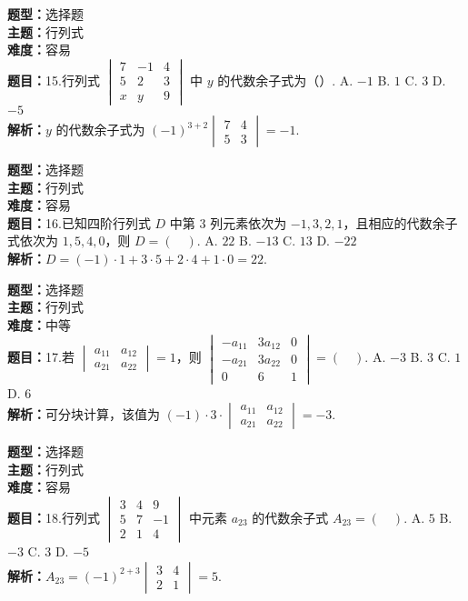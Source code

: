 \documentclass{ctexart}
\newenvironment{question}[5]{%
	\noindent\textbf{题型：}#1\\
	\textbf{主题：}#2\\
	\textbf{难度：}#3\\
	\textbf{题目：}#4\\
	\textbf{解析：}#5\\
	\vspace{1em}
}{}
\begin{document}
	\begin{question}
		{选择题}
		{行列式}
		{容易}
		{15.行列式 \(\begin{vmatrix}7 & -1 & 4 \\ 5 & 2 & 3 \\ x & y & 9\end{vmatrix}\) 中 \(y\) 的代数余子式为（\quad）. A. \(-1\) \quad B. \(1\) \quad C. \(3\) \quad D. \(-5\)}
		{\(y\) 的代数余子式为 \((-1)^{3+2} \begin{vmatrix}7 & 4 \\ 5 & 3\end{vmatrix} = -1\). }
	\end{question}
	
	\begin{question}
		{选择题}
		{行列式}
		{容易}
		{16.已知四阶行列式 \(D\) 中第 3 列元素依次为 \(-1,3,2,1\)，且相应的代数余子式依次为 \(1,5,4,0\)，则 \(D=(\quad)\). A. \(22\) \quad B. \(-13\) \quad C. \(13\) \quad D. \(-22\)}
		{\(D = (-1)\cdot 1 + 3\cdot 5 + 2\cdot 4 + 1\cdot 0 = 22\). }
	\end{question}
	
	\begin{question}
		{选择题}
		{行列式}
		{中等}
		{17.若 \(\begin{vmatrix}a_{11} & a_{12} \\ a_{21} & a_{22}\end{vmatrix} = 1\)，则 \(\begin{vmatrix}-a_{11} & 3a_{12} & 0 \\ -a_{21} & 3a_{22} & 0 \\ 0 & 6 & 1\end{vmatrix}=(\quad)\). A. \(-3\) \quad B. \(3\) \quad C. \(1\) \quad D. \(6\)}
		{可分块计算，该值为 \((-1) \cdot 3 \cdot \begin{vmatrix}a_{11} & a_{12} \\ a_{21} & a_{22}\end{vmatrix} = -3\). }
	\end{question}
	
	\begin{question}
		{选择题}
		{行列式}
		{容易}
		{18.行列式 \(\begin{vmatrix}3 & 4 & 9 \\ 5 & 7 & -1 \\ 2 & 1 & 4\end{vmatrix}\) 中元素 \(a_{23}\) 的代数余子式 \(A_{23}=(\quad)\). A. \(5\) \quad B. \(-3\) \quad C. \(3\) \quad D. \(-5\)}
		{\(A_{23} = (-1)^{2+3} \begin{vmatrix}3 & 4 \\ 2 & 1\end{vmatrix} = 5\). }
	\end{question}
	
\end{document}
